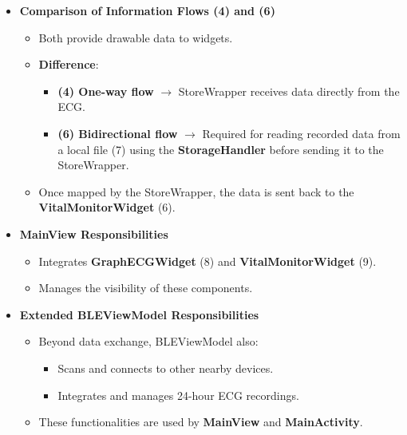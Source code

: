 {\begin{itemize}
		\item \textbf{Comparison of Information Flows (4) and (6)}  
		\begin{itemize}
			\item Both provide drawable data to widgets.  
			\item \textbf{Difference}:  
			\begin{itemize}
				\item \textbf{(4) One-way flow} $\rightarrow$ StoreWrapper receives data directly from the ECG.  
				\item \textbf{(6) Bidirectional flow} $\rightarrow$ Required for reading recorded data from a local file (7) using the \textbf{StorageHandler} before sending it to the StoreWrapper.  
			\end{itemize}
			\item Once mapped by the StoreWrapper, the data is sent back to the \textbf{VitalMonitorWidget} (6).  
		\end{itemize}
		
		\item \textbf{MainView Responsibilities}  
		\begin{itemize}
			\item Integrates \textbf{GraphECGWidget} (8) and \textbf{VitalMonitorWidget} (9).  
			\item Manages the visibility of these components.  
		\end{itemize}
		
		\item \textbf{Extended BLEViewModel Responsibilities}  
		\begin{itemize}
			\item Beyond data exchange, BLEViewModel also:  
			\begin{itemize}
				\item Scans and connects to other nearby devices.  
				\item Integrates and manages 24-hour ECG recordings.  
			\end{itemize}
			\item These functionalities are used by \textbf{MainView} and \textbf{MainActivity}.  
		\end{itemize}
		

\end{itemize}}
